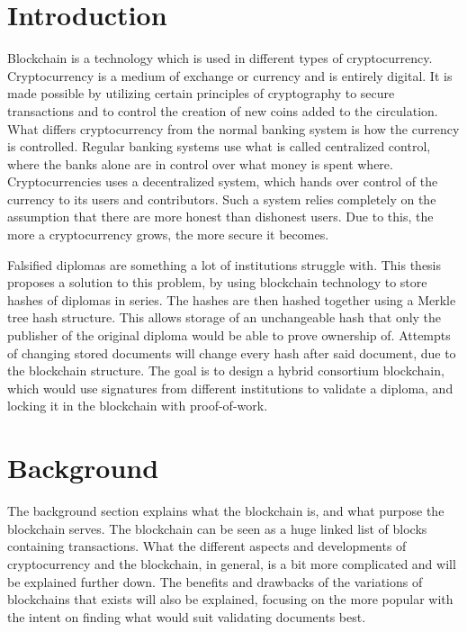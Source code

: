 \documentclass[11pt]{article}
\begin{document}
\newpage
{}
\setcounter{page}{\theCurrentPage}

\section{Introduction}

Blockchain is a technology which is used in different types of cryptocurrency. Cryptocurrency is a medium of exchange or currency and is entirely digital. It is made possible by utilizing certain principles of cryptography to secure transactions and to control the creation of new coins added to the circulation. What differs cryptocurrency from the normal banking system is how the currency is controlled. Regular banking systems use what is called centralized control, where the banks alone are in control over what money is spent where. Cryptocurrencies uses a decentralized system, which hands over control of the currency to its users and contributors. Such a system relies completely on the assumption that there are more honest than dishonest users. Due to this, the more a cryptocurrency grows, the more secure it becomes. 

Falsified diplomas are something a lot of institutions struggle with. This thesis proposes a solution to this problem, by using blockchain technology to store hashes of diplomas in series. The hashes are then hashed together using a Merkle tree hash structure. This allows storage of an unchangeable hash that only the publisher of the original diploma would be able to prove ownership of. Attempts of changing stored documents will change every hash after said document, due to the blockchain structure. The goal is to design a hybrid consortium blockchain, which would use signatures from different institutions to validate a diploma, and locking it in the blockchain with proof-of-work. 

\section{Background}
The background section explains what the blockchain is, and what purpose the blockchain serves. The blockchain can be seen as a huge linked list of blocks containing transactions. What the different aspects and developments of cryptocurrency and the blockchain, in general, is a bit more complicated and will be explained further down. The benefits and drawbacks of the variations of blockchains that exists will also be explained, focusing on the more popular with the intent on finding what would suit validating documents best. 
\end{document}
